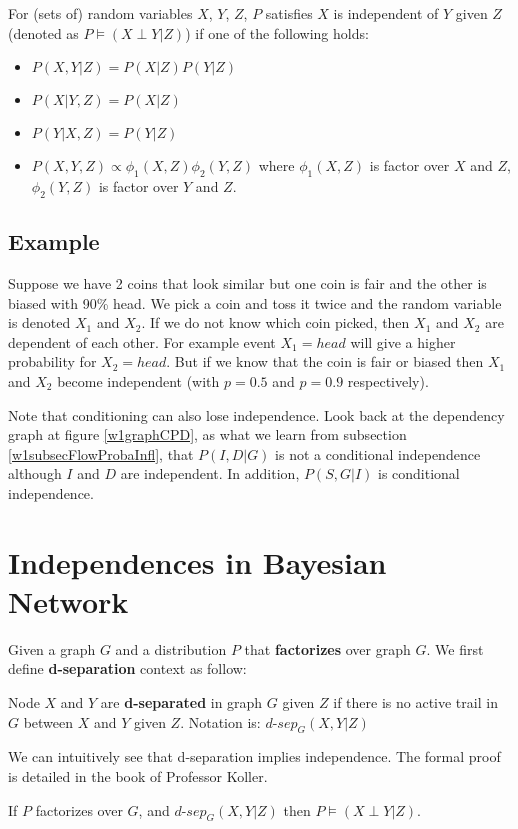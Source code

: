 \begin{defi}
For (sets of) random variables $X$, $Y$, $Z$, $P$ satisfies $X$ is independent of $Y$ given $Z$ (denoted as $P \models (X \perp Y | Z)$) if one of the following holds:
\begin{itemize}
	\item $P(X,Y |Z) = P(X|Z)P(Y|Z)$
	\item $P(X   |Y,Z) = P(X|Z)$
	\item $P(Y   |X,Z) = P(Y|Z)$
	\item $P(X,Y,Z) \propto \phi_1(X,Z) \phi_2(Y,Z)$ where $\phi_1(X,Z)$ is factor over $X$ and $Z$, $\phi_2(Y,Z)$ is factor over $Y$ and $Z$.
\end{itemize}	
\end{defi}

\subsection{Example}
Suppose we have 2 coins that look similar but one coin is fair and the other is biased with 90\% head. We pick a coin and toss it twice and the random variable is denoted $X_1$ and $X_2$. If we do not know which coin picked, then $X_1$ and $X_2$ are dependent of each other. For example event $X_1 = head$ will give a higher probability for $X_2 = head$. But if we know that the coin is fair or biased then $X_1$ and $X_2$ become independent (with $p = 0.5$ and $p=0.9$ respectively). 

Note that conditioning can also lose independence. Look back at the dependency graph at figure \ref{w1graphCPD}, as what we learn from subsection \ref{w1subsecFlowProbaInfl}, that $P(I, D | G)$ is not a conditional independence although $I$ and $D$ are independent. In addition, $P(S,G | I)$ is conditional independence. 

\section{Independences in Bayesian Network}
Given a graph $G$ and a distribution $P$ that \textbf{factorizes} over graph $G$. We first define \textbf{d-separation} context as follow:
\begin{defi}[d-separation]
	Node $X$ and $Y$ are \textbf{d-separated} in graph $G$ given $Z$ if there is no active trail in $G$ between $X$ and $Y$ given $Z$. Notation is: $d\text{-}sep_G(X,Y|Z)$
\end{defi}
We can intuitively see that d-separation implies independence. The formal proof is detailed in the book of Professor Koller. 
\begin{theorem}
If $P$ factorizes over $G$, and $d\text{-}sep_G(X,Y|Z)$ then $P \models (X \perp Y | Z)$.
\end{theorem}

